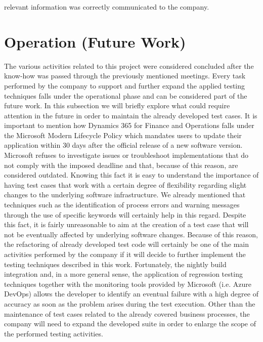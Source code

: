 relevant information was correctly communicated to the company.

\section{Operation (Future Work)} 

The various activities related to this project were considered concluded after the know-how was passed through the previously mentioned meetings. Every task performed by the company to support and further expand the applied testing techniques falls under the operational phase and can be considered part of the future work. In this subsection we will briefly explore what could require attention in the future in order to maintain the already developed test cases. It is important to mention how Dynamics 365 for Finance and Operations falls under the Microsoft Modern Lifecycle Policy which mandates users to update their application within 30 days after the official release of a new software version. Microsoft refuses to investigate issues or troubleshoot implementations that do not comply with the imposed deadline and that, because of this reason, are considered outdated. Knowing this fact it is easy to understand the importance of having test cases that work with a certain degree of flexibility regarding slight changes to the underlying software infrastructure. We already mentioned that techniques such as the identification of process errors and warning messages through the use of specific keywords will certainly help in this regard. Despite this fact, it is fairly unreasonable to aim at the creation of a test case that will not be eventually affected by underlying software changes. Because of this reason, the refactoring of already developed test code will certainly be one of the main activities performed by the company if it will decide to further implement the testing techniques described in this work. Fortunately, the nightly build integration and, in a more general sense, the application of regression testing techniques together with the monitoring tools provided by Microsoft (i.e. Azure DevOps) allows the developer to identify an eventual failure with a high degree of accuracy as soon as the problem arises during the test execution. 
Other than the maintenance of test cases related to the already covered business processes, the company will need to expand the developed suite in order to enlarge the scope of the performed testing activities. 
